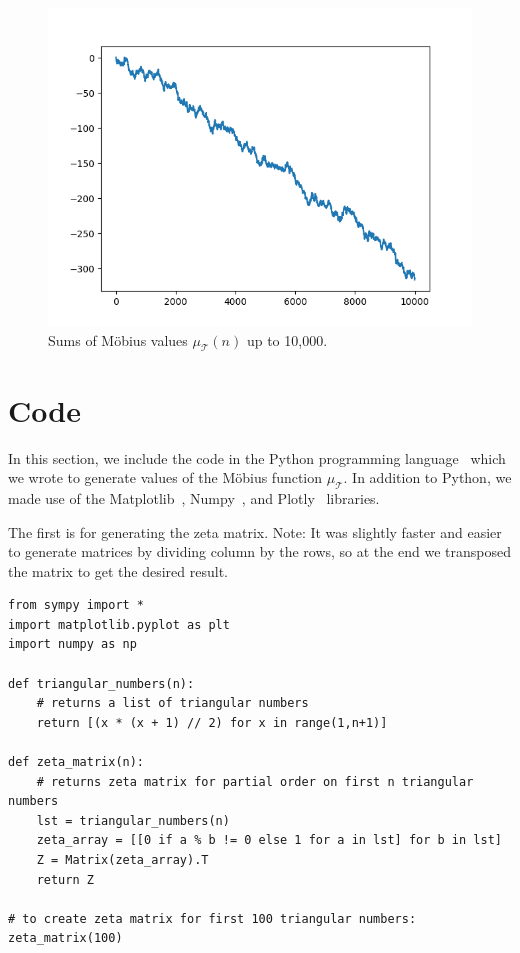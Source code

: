 \documentclass{amsart}
\theoremstyle{definition}
\newcommand{\Mobius}{M\"obius}
\newcommand{\mutri}{\mu_{\tri}}
\newcommand{\tri}{\mathcal T}
\newenvironment{graybox}
    {\begin{mdframed}[
    backgroundcolor=light-gray, 
    linecolor=light-gray,
    leftmargin=1, 
    rightmargin=1, 
    innerleftmargin=15, 
    innertopmargin=5,
    innerbottommargin=5, 
    outerlinewidth=1, 
    ]}
    {\end{mdframed}}
\begin{document}
\begin{figure}[h!]
    \centering
    \includegraphics[scale=0.8]{10000_Sum_Function}
    \caption{Sums of \Mobius{} values $\mutri(n)$ up to 10,000.}
    \label{fig:mobius-sum-10000}
\end{figure}

\newpage
\section{Code}

In this section, we include the code in the Python programming language~\cite{python} which we wrote to generate values of the \Mobius{} function $\mutri$.
In addition to Python, we made use of the Matplotlib~\cite{matplotlib}, Numpy~\cite{numpy}, and Plotly~\cite{plotly} libraries.

The first is for generating the zeta matrix.
Note: It was slightly faster and easier to generate matrices by dividing column by the rows, so at the end we transposed the matrix to get the desired result. 
\begin{graybox}
\begin{lstlisting}
from sympy import *
import matplotlib.pyplot as plt
import numpy as np

def triangular_numbers(n):
    # returns a list of triangular numbers
    return [(x * (x + 1) // 2) for x in range(1,n+1)]
    
def zeta_matrix(n):
    # returns zeta matrix for partial order on first n triangular numbers
    lst = triangular_numbers(n)
    zeta_array = [[0 if a % b != 0 else 1 for a in lst] for b in lst]
    Z = Matrix(zeta_array).T
    return Z

# to create zeta matrix for first 100 triangular numbers:
zeta_matrix(100)
\end{lstlisting}
\end{graybox}
\end{document}
